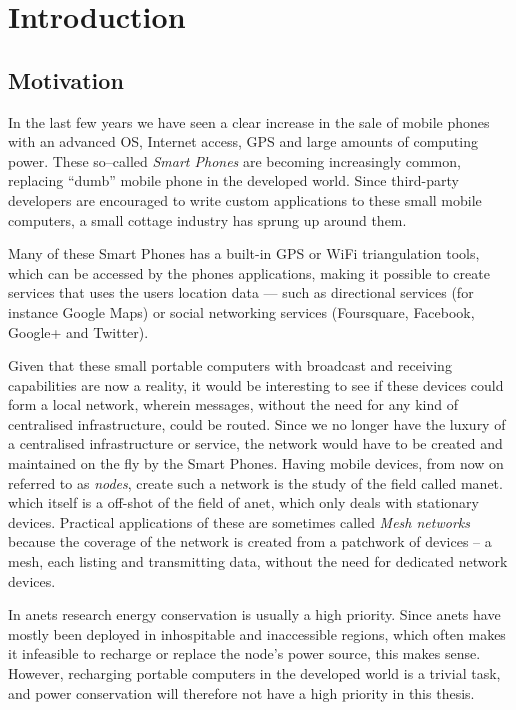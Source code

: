 \section{Introduction}
\label{section:introduction} 

\subsection{Motivation}

In the last few years we have seen a clear increase in the sale of mobile phones with an advanced OS, Internet access, GPS and large amounts of computing power. These so--called \emph{Smart Phones} are becoming increasingly common, replacing ``dumb'' mobile phone in the developed world. Since third-party developers are encouraged to write custom applications to these small mobile computers, a small cottage industry has sprung up around them.
 
Many of these Smart Phones has a built-in GPS or WiFi triangulation tools, which can be accessed by the phones applications, making it possible to create services that uses the users location data --- such as directional services (for instance Google Maps) or social networking services (Foursquare, Facebook, Google+ and Twitter).

Given that these small portable computers with broadcast and receiving capabilities are now a reality, it would be interesting to see if these devices could form a local network, wherein messages, without the need for any kind of centralised infrastructure, could be routed. Since we no longer have the luxury of a centralised infrastructure or service, the network would have to be created and maintained on the fly by the Smart Phones. Having mobile devices, from now on referred to as \emph{nodes}, create such a network is the study of the field called \ac{manet}. which itself is a off-shot of the field of \ac{anet}, which only deals with stationary devices. Practical applications of these are sometimes called \emph{Mesh networks} because the coverage of the network is created from a patchwork of devices -- a mesh, each listing and transmitting data, without the need for dedicated network devices.  

In \acp{anet} research energy conservation is usually a high priority. Since \acp{anet} have mostly been deployed in inhospitable and inaccessible regions, which often makes it infeasible to recharge or replace the node's power source, this makes sense. However, recharging portable computers in the developed world is a trivial task, and power conservation will therefore not have a high priority in this thesis. 

